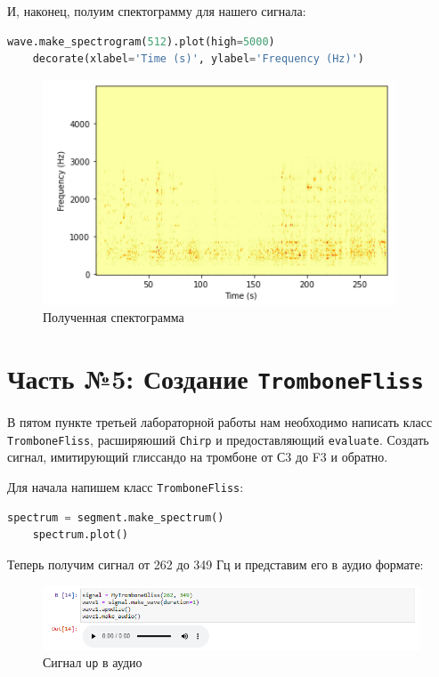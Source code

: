 \documentclass[a4paper]{article}
\begin{document}
            И, наконец, полуим спектограмму для нашего сигнала:
            
\begin{lstlisting}[language=Python, caption= Получение спектограммы]
    wave.make_spectrogram(512).plot(high=5000)
    decorate(xlabel='Time (s)', ylabel='Frequency (Hz)')
\end{lstlisting}   
            
             \begin{figure}[H]
                \centering
                \includegraphics{ex_4_spectogramma.png}
                \caption{Полученная спектограмма}
                \label{fig:ex_4_spectogramma}
            \end{figure}
            
    
    \newpage
        \section{Часть №5: Создание \texttt{TromboneFliss}}
            В пятом пункте третьей лабораторной работы нам необходимо написать класс \texttt{TromboneFliss}, расширяюший \texttt{Chirp} и предоставляющий \texttt{evaluate}. Создать сигнал, имитирующий глиссандо на тромбоне от С3 до F3 и обратно.
            
            Для начала напишем класс \texttt{TromboneFliss}:
            
\begin{lstlisting}[language=Python, caption= Класс \texttt{TromboneFliss}]
    spectrum = segment.make_spectrum()
    spectrum.plot()
\end{lstlisting}   
            
            Теперь получим сигнал от 262 до 349 Гц и представим его в аудио формате:
            
            \begin{figure}[H]
                \centering
                \includegraphics[width=\textwidth]{ex_5_signal_up_audio.png}
                \caption{Сигнал \texttt{up} в аудио}
                \label{fig:ex_5_signal_up_audio}
            \end{figure}
            
\end{document}
